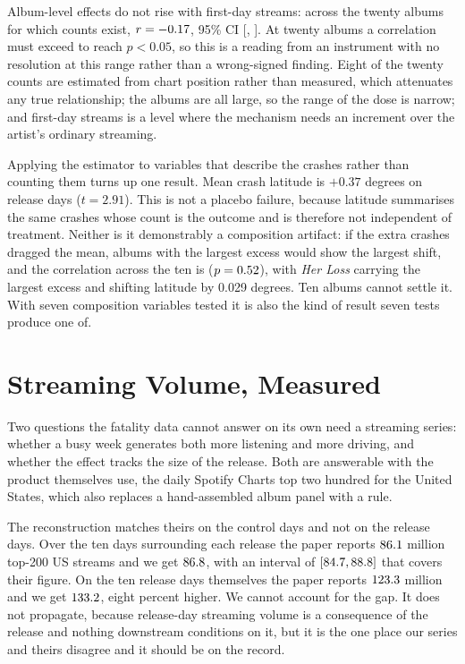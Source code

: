 \documentclass[11pt]{article}
\begin{document}
Album-level effects do not rise with first-day streams: across the twenty albums for which counts
exist, $r = -0.17$, 95\% CI [\numRDoseLo, \numRDoseHi]. At twenty albums a correlation must
exceed \numRDoseMinDetectable{} to reach $p < 0.05$, so this is a reading from an instrument with
no resolution at this range rather than a wrong-signed finding. Eight of the twenty counts are
estimated from chart position rather than measured, which attenuates any true relationship; the
albums are all large, so the range of the dose is narrow; and first-day streams is a level where
the mechanism needs an increment over the artist's ordinary streaming.

Applying the estimator to variables that describe the crashes rather than counting them turns up
one result. Mean crash latitude is $+0.37$ degrees on release days ($t = 2.91$). This is not a
placebo failure, because latitude summarises the same crashes whose count is the outcome and is
therefore not independent of treatment. Neither is it demonstrably a composition artifact: if the
extra crashes dragged the mean, albums with the largest excess would show the largest shift, and
the correlation across the ten is \numRLatitudeExcess{} ($p = 0.52$), with
\emph{Her Loss} carrying the largest excess and shifting latitude by 0.029 degrees. Ten albums
cannot settle it. With seven composition variables tested it is also the kind of result seven tests
produce one of.

\section{Streaming Volume, Measured}
\label{sec:streaming}

Two questions the fatality data cannot answer on its own need a streaming series: whether
a busy week generates both more listening and more driving, and whether the effect tracks
the size of the release. Both are answerable with the product
\citet{patel2026smartphones} themselves use, the daily Spotify Charts top two hundred for
the United States, which also replaces a hand-assembled album panel with a rule.

The reconstruction matches theirs on the control days and not on the release days. Over
the ten days surrounding each release the paper reports $86.1$
million top-200 US streams and we get $86.8$, with an interval of
$[84.7, 88.8]$ that covers their figure. On the ten release
days themselves the paper reports $123.3$ million and we get
$133.2$, eight percent higher. We cannot account for the gap. It does not
propagate, because release-day streaming volume is a consequence of the release and
nothing downstream conditions on it, but it is the one place our series and theirs
disagree and it should be on the record.
\end{document}

